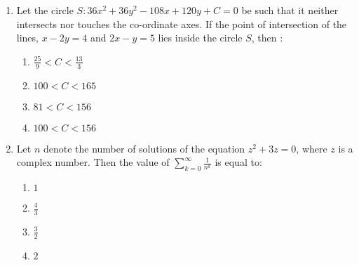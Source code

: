 \documentclass[journal]{IEEEtran}
\begin{document}
\begin{enumerate}
{\begin{multicols}{4}
\begin{enumerate}
\item $\lsbrak{}0, \frac{1}{e}\rbrak{}$
\item $\lsbrak{} \log_e{2}, \log_e{3}\rbrak{}$
\item $\lsbrak{}1, e\rbrak{}$
\item $\lsbrak{}0, \log_e{2}\rbrak{}$
\end{enumerate}
\end{multicols}
}
\item{
Let the circle $S: 36x^2 + 36y^2 - 108x + 120y + C = 0$ be such that it neither intersects nor touches the
co-ordinate axes. If the point of intersection of the lines, $x - 2y = 4$ and $2x - y = 5$ lies inside the
circle $S$, then :
\begin{multicols}{4}
\begin{enumerate}
\item $\frac{25}{9} < C < \frac{13}{3}$
\item $100 < C < 165$
\item $ 81 < C < 156$
\item $100 < C < 156$
\end{enumerate}
\end{multicols}
}
\item{
Let $n$ denote the number of solutions of the equation $z^2 + 3z = 0$, where $z$ is a complex number. Then the value of $\sum_{k=0}^{\infty} \frac{1}{n^k}$ is equal to:
\begin{multicols}{4}              
\begin{enumerate}
\item $1$
\item $\frac{4}{3}$
\item $\frac{3}{2}$
\item $2$
\end{enumerate}
\end{multicols}      
}
\end{enumerate}
\end{document}
